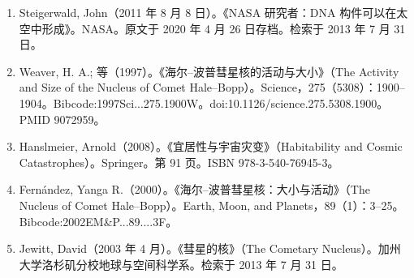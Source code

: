 \begin{enumerate}
\item Steigerwald, John（2011 年 8 月 8 日）。《NASA 研究者：DNA 构件可以在太空中形成》。NASA。原文于 2020 年 4 月 26 日存档。检索于 2013 年 7 月 31 日。

\item Weaver, H. A.; 等（1997）。《海尔–波普彗星核的活动与大小》（The Activity and Size of the Nucleus of Comet Hale–Bopp）。Science，275（5308）：1900–1904。Bibcode:1997Sci...275.1900W。doi:10.1126/science.275.5308.1900。PMID 9072959。

\item Hanslmeier, Arnold（2008）。《宜居性与宇宙灾变》（Habitability and Cosmic Catastrophes）。Springer。第 91 页。ISBN 978-3-540-76945-3。

\item Fernández, Yanga R.（2000）。《海尔–波普彗星核：大小与活动》（The Nucleus of Comet Hale–Bopp）。Earth, Moon, and Planets，89（1）：3–25。Bibcode:2002EM&P...89....3F。

\item Jewitt, David（2003 年 4 月）。《彗星的核》（The Cometary Nucleus）。加州大学洛杉矶分校地球与空间科学系。检索于 2013 年 7 月 31 日。
\end{enumerate}










